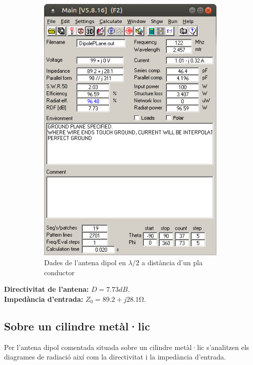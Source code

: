 \begin{figure}[H]
\begin{subfigure}[b]{0.33\textwidth}
	  \includegraphics[width=\textwidth]{./images/2.Dypole_overPlane/menu.png}
	  \caption{Dades de l'antena dipol en $\lambda/2$ a distància d'un pla conductor}
	  \label{2menu}
	  \end{subfigure}
	  \vspace{10pt}
	\caption{}
	\label{diag4}
	\end{figure}

	\textbf{Directivitat de l'antena:} $ D=7.73 dB$. \\
	\textbf{Impedància d'entrada:} $ Z_0=89.2+j28.1 \si{\ohm}$.


 \subsection{Sobre un cilindre metàl·lic}

  Per l'antena dipol comentada situada sobre un cilindre metàl·lic s'analitzen els diagrames de radiació així com la directivitat i la impedància d'entrada.

